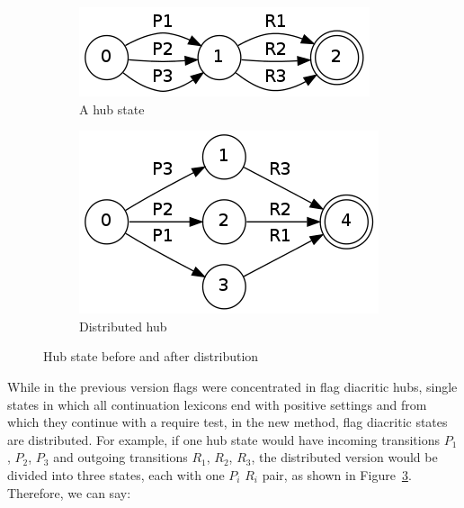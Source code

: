 \documentclass[11pt]{article}
\begin{document}
\begin{figure}
\centering
\begin{subfigure}[b]{0.4\textwidth}
        \includegraphics[width=\textwidth]{hub.png}
        \caption{A hub state}
        \label{fig:hub}
\end{subfigure}%
\quad %
\begin{subfigure}[b]{0.4\textwidth}
        \includegraphics[width=\textwidth]{distr.png}
        \caption{Distributed hub}
        \label{fig:distr}
\end{subfigure}
\caption{Hub state before and after distribution}
\label{fig:hub_distr}
\end{figure}


While in the previous version flags were concentrated in flag diacritic hubs, single states in which all continuation lexicons end with positive settings and from which they continue with a require test, in the new method, flag diacritic states are distributed. For example, if one hub state would have incoming transitions 
$P_1$, $P_2$, $P_3$ and outgoing transitions $R_1$, $R_2$, $R_3$, the distributed version would be divided into three states, each with one 
$P_i$ $R_i$ pair, as shown in 
Figure~\ref{fig:hub_distr}. Therefore, we can say:
\end{document}
